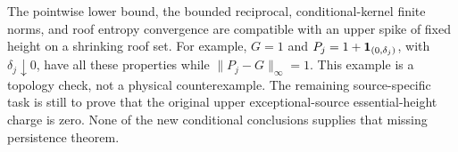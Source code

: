 \begin{remark}
\label{rem:v92-scope}
The pointwise lower bound, the bounded reciprocal, conditional-kernel
finite norms, and roof entropy convergence are compatible with an
upper spike of fixed height on a shrinking roof set. For example,
$G=1$ and $P_j=1+\mathbf1_{(0,\delta_j)}$, with $\delta_j\downarrow0$,
have all these properties while $\|P_j-G\|_\infty=1$. This example
is a topology check, not a physical counterexample. The remaining
source-specific task is still to prove that the original upper
exceptional-source essential-height charge is zero. None of the new
conditional conclusions supplies that missing persistence theorem.
\end{remark}
